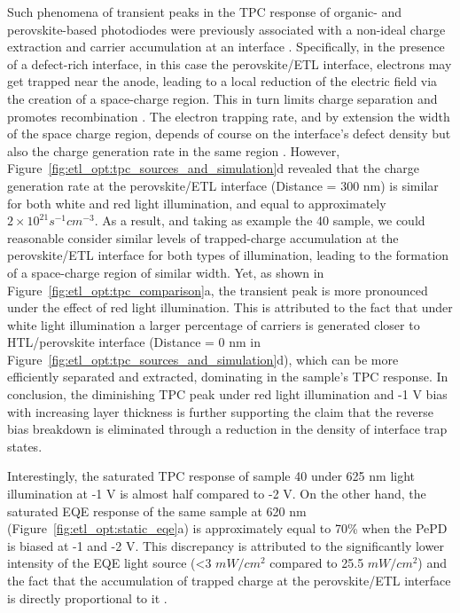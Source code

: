 Such phenomena of transient peaks in the TPC response of organic- and perovskite-based photodiodes were previously associated with a non-ideal charge extraction and carrier accumulation at an interface \cite{Neophytou2019EnhancingLayer, Hwang2009Drift-diffusionCells,Mcneill2009PhotocurrentEffects}. Specifically, in the presence of a defect-rich interface, in this case the perovskite/ETL interface, electrons may get trapped near the anode, leading to a local reduction of the electric field via the creation of a space-charge region. This in turn limits charge separation and promotes recombination \cite{Mcneill2009PhotocurrentEffects}. The electron trapping rate, and by extension the width of the space charge region, depends of course on the interface's defect density but also the charge generation rate in the same region \cite{Hwang2009Drift-diffusionCells}. However, Figure~\ref{fig:etl_opt:tpc_sources_and_simulation}d revealed that the charge generation rate at the perovskite/ETL interface (Distance = 300 nm) is similar for both white and red light illumination, and equal to approximately $2\times 10^{21}s^{-1}cm^{-3}$. As a result, and taking as example the 40 sample, we could reasonable consider similar levels of trapped-charge accumulation at the perovskite/ETL interface for both types of illumination, leading to the formation of a space-charge region of similar width. Yet, as shown in Figure~\ref{fig:etl_opt:tpc_comparison}a, the transient peak is more pronounced under the effect of red light illumination. This is attributed to the fact that under white light illumination a larger percentage of carriers is generated closer to HTL/perovskite interface (Distance = 0 nm in Figure~\ref{fig:etl_opt:tpc_sources_and_simulation}d), which can be more efficiently separated and extracted, dominating in the sample's TPC response. In conclusion, the diminishing TPC peak under red light illumination and -1 V bias with increasing  layer thickness is further supporting the claim that the reverse bias breakdown is eliminated through a reduction in the density of interface trap states.

Interestingly, the saturated TPC response of sample 40 under 625 nm light illumination at -1 V is almost half compared to -2 V. On the other hand, the saturated EQE response of the same sample at 620 nm (Figure~\ref{fig:etl_opt:static_eqe}a) is approximately equal to 70\% when the PePD is biased at -1 and -2 V. This discrepancy is attributed to the significantly lower intensity of the EQE light source (<3 $mW/cm^2$ compared to 25.5 $mW/cm^2$) and the fact that the accumulation of trapped charge at the perovskite/ETL interface is directly proportional to it \cite{Hwang2009Drift-diffusionCells,Mcneill2009PhotocurrentEffects}.

